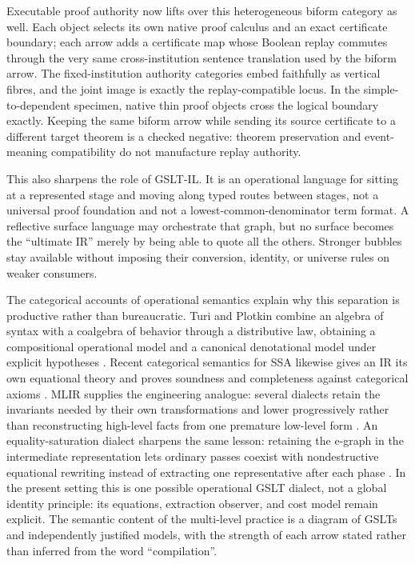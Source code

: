 \documentclass[11pt]{article}
\theoremstyle{definition}
\theoremstyle{remark}
\begin{document}
Executable proof authority now lifts over this heterogeneous biform category as
well.  Each object selects its own native proof calculus and an exact certificate
boundary; each arrow adds a certificate map whose Boolean replay commutes through
the very same cross-institution sentence translation used by the biform arrow.
The fixed-institution authority categories embed faithfully as vertical fibres,
and the joint image is exactly the replay-compatible locus.  In the
simple-to-dependent specimen, native thin proof objects cross the logical
boundary exactly.  Keeping the same biform arrow while sending its source
certificate to a different target theorem is a checked negative: theorem
preservation and event-meaning compatibility do not manufacture replay
authority.

This also sharpens the role of GSLT-IL.  It is an operational language for
sitting at a represented stage and moving along typed routes between stages,
not a universal proof foundation and not a lowest-common-denominator term
format.  A reflective surface language may orchestrate that graph, but no
surface becomes the ``ultimate IR'' merely by being able to quote all the
others.  Stronger bubbles stay available without imposing their conversion,
identity, or universe rules on weaker consumers.

The categorical accounts of operational semantics explain why this separation
is productive rather than bureaucratic.  Turi and Plotkin combine an algebra of
syntax with a coalgebra of behavior through a distributive law, obtaining a
compositional operational model and a canonical denotational model under
explicit hypotheses \cite{TuriPlotkinMOS}.  Recent categorical semantics for
SSA likewise gives an IR its own equational theory and proves soundness and
completeness against categorical axioms \cite{GhalayiniKrishnaswamiSSA}.
MLIR supplies the engineering analogue: several dialects retain the invariants
needed by their own transformations and lower progressively rather than
reconstructing high-level facts from one premature low-level form
\cite{MLIRRationale}.  An equality-saturation dialect sharpens the same
lesson: retaining the e-graph in the intermediate representation lets ordinary
passes coexist with nondestructive equational rewriting instead of extracting
one representative after each phase \cite{EqSatDialect}.  In the present
setting this is one possible operational GSLT dialect, not a global identity
principle: its equations, extraction observer, and cost model remain explicit.
The semantic content of the multi-level practice is a diagram of GSLTs and
independently justified models, with the strength of each arrow stated rather
than inferred from the word ``compilation''.
\end{document}
